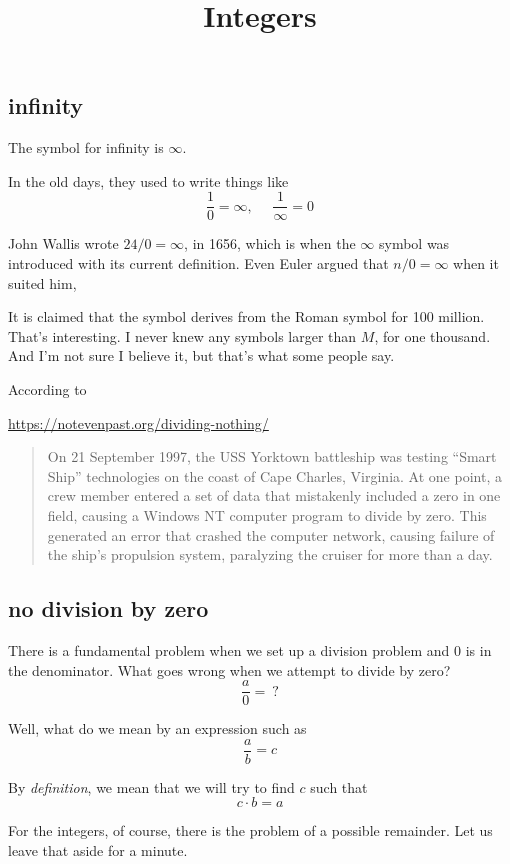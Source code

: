 \documentclass[11pt, oneside]{article}
\title{Integers}
\date{}
\begin{document}
\maketitle
\Large

\subsection*{infinity}
The symbol for infinity is $\infty$.

In the old days, they used to write things like
\[ \frac{1}{0} = \infty,  \ \ \ \ \ \ \frac{1}{\infty} = 0 \]

John Wallis wrote $24/0 = \infty$, in 1656, which is when the $\infty$ symbol was introduced with its current definition.  Even Euler argued that $n/0 = \infty$ when it suited him,

It is claimed that the symbol derives from the Roman symbol for 100 million.  That's interesting.  I never knew any symbols larger than $M$, for one thousand.  And I'm not sure I believe it, but that's what some people say.

According to

\url{https://notevenpast.org/dividing-nothing/}

\begin{quote}
On 21 September 1997, the USS Yorktown battleship was testing “Smart Ship” technologies on the coast of Cape Charles, Virginia. At one point, a crew member entered a set of data that mistakenly included a zero in one field, causing a Windows NT computer program to divide by zero. This generated an error that crashed the computer network, causing failure of the ship’s propulsion system, paralyzing the cruiser for more than a day.
\end{quote}

\subsection*{no division by zero}
There is a fundamental problem when we set up a division problem and $0$ is in the denominator.  What goes wrong when we attempt to divide by zero?
\[ \frac{a}{0} = \ ? \]

Well, what do we mean by an expression such as 
\[ \frac{a}{b} = c \]

By \emph{definition}, we mean that we will try to find $c$ such that
\[ c \cdot b = a \]

For the integers, of course, there is the problem of a possible remainder.  Let us leave that aside for a minute.
\end{document}
